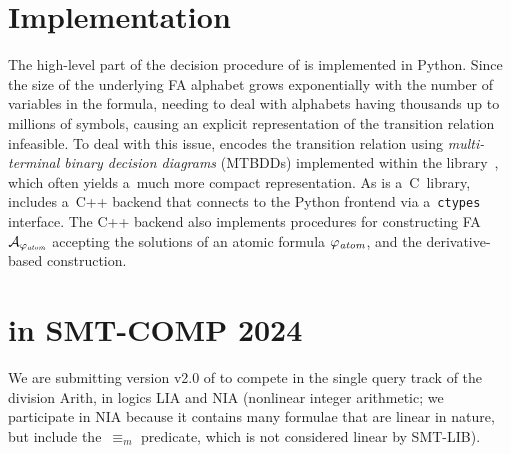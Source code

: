 \documentclass[acmsmall,screen,nonacm=true]{acmart}
\begin{document}

\vspace{-0.0mm}
\section{Implementation}\label{sec:label}
\vspace{-0.0mm}

The high-level part of the decision procedure of \amaya is implemented in Python.
Since the size of the underlying FA alphabet grows exponentially with the number of variables in the formula, needing to deal with alphabets having thousands up to millions of symbols, causing an explicit representation of the transition relation infeasible.
To deal with this issue, \amaya encodes the transition relation using
\emph{multi-terminal binary decision diagrams} (MTBDDs) implemented within the
\sylvan library~\cite{DijkP15}, which often yields a~much more compact representation.
As \sylvan is a~C~library, \amaya includes a~C++ backend that connects to the
Python frontend via a~\texttt{ctypes} interface. The C++ backend also implements
procedures for constructing FA~$\mathcal{A}_{\varphi_{\mathit{atom}}}$ accepting the solutions
of an atomic formula $\varphi_{\mathit{atom}}$, and the derivative-based
construction.




\vspace{-0.0mm}
\section{\amaya in SMT-COMP 2024}\label{sec:label}
\vspace{-0.0mm}

We are submitting version v2.0 of \amaya to compete in the single query track
of the division Arith, in logics LIA and NIA (nonlinear integer arithmetic; we
participate in NIA because it contains many formulae that are linear in nature, but
include the~$\equiv_m$ predicate, which is not considered linear by SMT-LIB).








\end{document}
